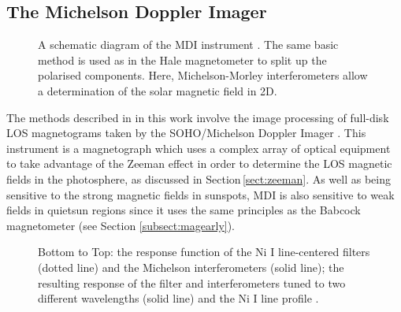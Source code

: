 \subsection{The Michelson Doppler Imager} \label{subsect:mdi}

\begin{figure}[!t]
\caption[A schematic diagram of MDI.]{A schematic diagram of the MDI instrument \citep[from][]{Scherrer:1995}. The same basic method is used as in the Hale magnetometer to split up the polarised components. Here, Michelson-Morley interferometers allow a determination of the solar magnetic field in 2D.}
\label{fig:mdidiagram}
\end{figure}

The methods described in in this work involve the image processing of full-disk \gls{LOS} magnetograms taken by the \gls{SOHO}/Michelson Doppler Imager \citep[MDI;][]{Scherrer:1995}. This instrument is a magnetograph which uses a complex array of optical equipment to take advantage of the Zeeman effect in order to determine the \gls{LOS} magnetic fields in the photosphere, as discussed in Section\,\ref{sect:zeeman}. 
As well as being sensitive to the strong magnetic fields in sunspots, MDI is also sensitive to weak fields in \gls{quietsun} regions since it uses the same principles as the Babcock magnetometer (see Section \ref{subsect:magearly}).

\begin{figure}[!t]
\caption[The instrument response of MDI.]{Bottom to Top: the response function of the Ni I line-centered filters (dotted line) and the Michelson interferometers (solid line); the resulting response of the filter and interferometers tuned to two different wavelengths (solid line) and the Ni I line profile \citep[dotted line; from][]{Scherrer:1995}.}
\label{fig:mdiresponse}
\end{figure}

